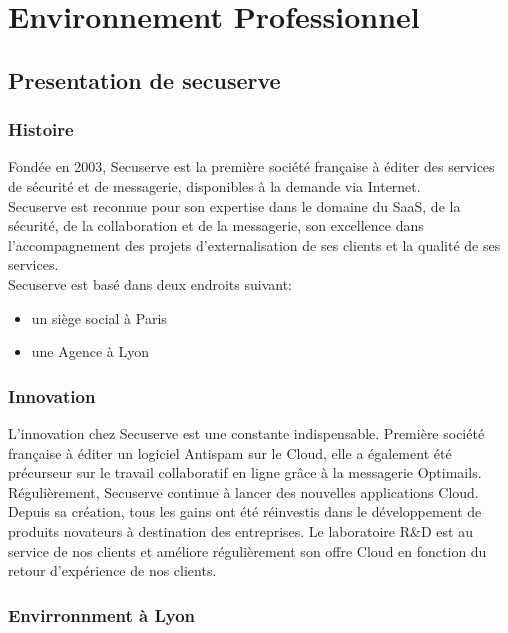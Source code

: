 \section{Environnement Professionnel }
\subsection{Presentation de secuserve}
\subsubsection{Histoire}
Fondée en 2003, Secuserve est la première société française à éditer des services de sécurité et de messagerie, disponibles à la demande via Internet.\\
Secuserve est reconnue pour son expertise dans le domaine du SaaS, de la sécurité, de la collaboration et de la messagerie, son excellence dans l’accompagnement des projets d’externalisation de ses clients et la qualité de ses services.\\
Secuserve est basé dans deux endroits suivant: 
\begin{itemize}
\item un siège social à Paris 
\item une Agence à Lyon
\end{itemize}
\subsubsection{Innovation}
L’innovation chez Secuserve est une constante indispensable. Première société française à éditer un logiciel Antispam sur le Cloud, elle a également été précurseur sur le travail collaboratif en ligne grâce à la messagerie Optimails. Régulièrement, Secuserve continue à lancer des nouvelles applications Cloud.\\ Depuis sa création, tous les gains ont été réinvestis dans le développement de produits novateurs à destination des entreprises. Le laboratoire R\&D est au service de nos clients et améliore régulièrement son offre Cloud en fonction du retour d’expérience de nos clients.\\
\subsubsection{Envirronnment à Lyon}
